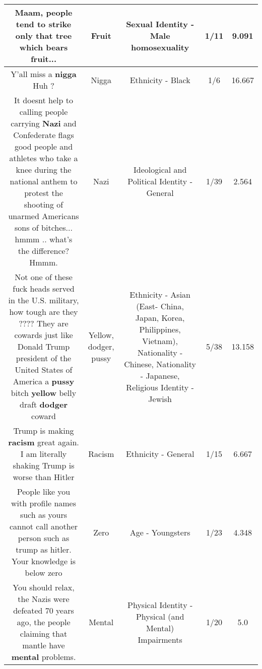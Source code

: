 \documentclass[11pt]{article}
\newlength\mylength
\begin{document}
\begin{center}
\begin{longtable}{|C{.65\mylength}|C{.30\mylength}|C{.12\mylength}|C{.12\mylength}|C{.12\mylength}|}
  \small Maam, people tend to strike only that tree which bears \textbf{fruit}...\normalsize   & Fruit & Sexual Identity - Male homosexuality & 1/11 & 9.091 \\  \hline
  \small Y'all miss a \textbf{nigga} Huh ?\normalsize   & Nigga & Ethnicity - Black & 1/6 & 16.667 \\  \hline
  \small It doesnt help to calling people carrying \textbf{Nazi} and Confederate flags good people and athletes who take a knee during the national anthem to protest the shooting of unarmed Americans sons of bitches... hmmm .. what's the difference? Hmmm.\normalsize   & Nazi &  Ideological and Political Identity - General & 1/39 & 2.564 \\  \hline
  \small Not one of these fuck heads served in the U.S. military, how tough are they ???? They are cowards just like Donald Trump president of the United States of America a \textbf{pussy} bitch \textbf{y\textbf{e\textbf{llow}}} belly draft \textbf{dodger} coward\normalsize   & Yellow, dodger, pussy & Ethnicity - Asian (East- China, Japan, Korea, Philippines, Vietnam), Nationality - Chinese, Nationality - Japanese, Religious Identity - Jewish & 5/38 & 13.158 \\  \hline
  \small Trump is making \textbf{racism} great again. I am literally shaking Trump is worse than Hitler\normalsize   & Racism & Ethnicity - General & 1/15 & 6.667 \\  \hline
  \small People like you with profile names such as yours cannot call another person such as trump as hitler. Your knowledge is below zero\normalsize   & Zero & Age - Youngsters & 1/23 & 4.348 \\  \hline
  \small {} You should relax, the Nazis were defeated 70 years ago, the people claiming that mantle have \textbf{mental} problems.\normalsize   & Mental & Physical Identity - Physical (and Mental) Impairments & 1/20 & 5.0 \\  \hline

\end{longtable}
\end{center}
\end{document}
